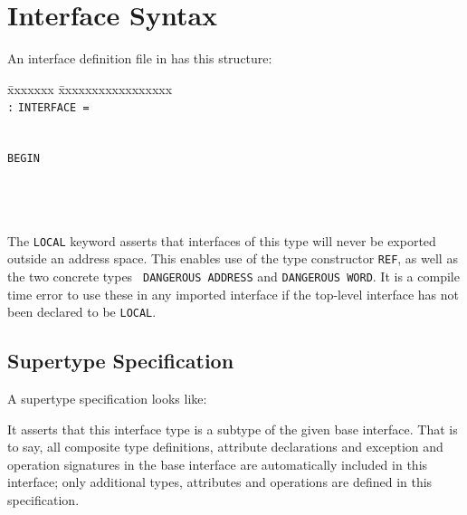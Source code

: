 \chapter{\MIDDL{} Interface Syntax}

  An interface definition file in \MIDDL{} has  this structure:


\begin{tabbing}
\= xxxxxxx \=xxxxxxxxxxxxxxxxx \kill \\
\>  {\tt :}  {\tt INTERFACE =} \\
\> \>  \\
\> \>  \\
\> {\tt BEGIN} \\
\> \>  \\
\> \>  \\
 \\
\end{tabbing}

The {\tt LOCAL} keyword asserts that interfaces of this type will
never be exported outside an address space. This enables use of the
type constructor {\tt REF}, as well as the two concrete types {\tt
  DANGEROUS ADDRESS} and {\tt DANGEROUS WORD}. It is a compile time
error to use these in any imported interface if the top-level
interface has not been declared to be {\tt LOCAL}.

\section{Supertype Specification}

A supertype specification looks like:


It asserts that this interface type is a subtype of the given base
interface. That is to say, all composite type definitions, attribute
declarations and exception and operation signatures in the base
interface are automatically included in this interface; only
additional types, attributes and operations are defined in this
specification. 

